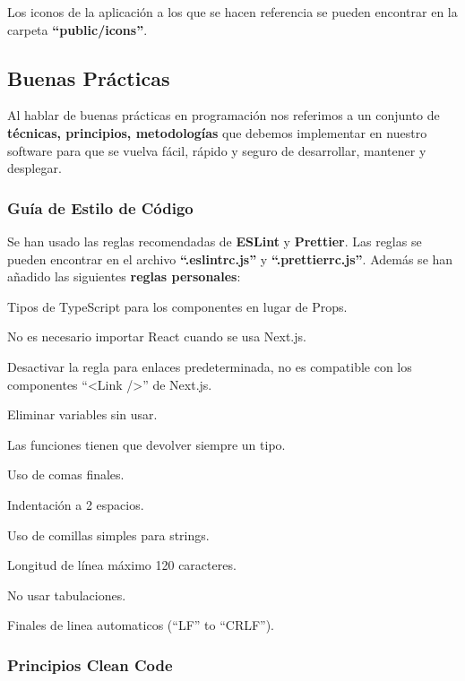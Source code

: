 \documentclass[12pt,twoside,titlepage]{report}
\begin{document}
Los iconos de la aplicación a los que se hacen referencia se pueden encontrar en la carpeta \textbf{``public/icons''}.


\subsection{Buenas Prácticas}

Al hablar de buenas prácticas en programación nos referimos a un conjunto de \textbf{técnicas, principios, metodologías} que debemos implementar en nuestro software para que se vuelva fácil, rápido y seguro de desarrollar, mantener y desplegar.

\subsubsection{Guía de Estilo de Código}

Se han usado las reglas recomendadas de \textbf{ESLint} y \textbf{Prettier}. Las reglas se pueden encontrar en el archivo \textbf{``.eslintrc.js''} y \textbf{``.prettierrc.js''}. Además se han añadido las siguientes \textbf{reglas personales}:

\begin{compactitem}
    \item Tipos de TypeScript para los componentes en lugar de Props.
    \item No es necesario importar React cuando se usa Next.js.
    \item Desactivar la regla para enlaces predeterminada, no es compatible con los componentes ``<Link />'' de Next.js.
    \item Eliminar variables sin usar.
    \item Las funciones tienen que devolver siempre un tipo.
    \item Uso de comas finales.
    \item Indentación a 2 espacios.
    \item Uso de comillas simples para strings.
    \item Longitud de línea máximo 120 caracteres.
    \item No usar tabulaciones.
    \item Finales de linea automaticos (``LF'' to ``CRLF'').
\end{compactitem}

\subsubsection{Principios Clean Code}
\end{document}
